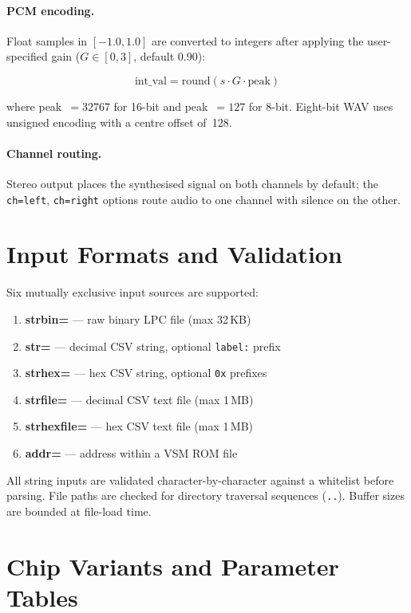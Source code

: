 \documentclass[10pt]{article}
\begin{document}
\paragraph{PCM encoding.}
Float samples in $[-1.0, 1.0]$ are converted to integers after applying the
user-specified gain ($G \in [0, 3]$, default 0.90):

\[
\text{int\_val} = \text{round}(s \cdot G \cdot \text{peak})
\]

where peak~$= 32767$ for 16-bit and peak~$= 127$ for 8-bit. Eight-bit WAV uses
unsigned encoding with a centre offset of~128.

\paragraph{Channel routing.}
Stereo output places the synthesised signal on both channels by default; the
\texttt{ch=left}, \texttt{ch=right} options route audio to one channel with
silence on the other.

\section{Input Formats and Validation}
\label{sec:input}

Six mutually exclusive input sources are supported:

\begin{enumerate}[noitemsep]
\item \textbf{strbin=} — raw binary LPC file (max 32\,KB)
\item \textbf{str=} — decimal CSV string, optional \texttt{label:} prefix
\item \textbf{strhex=} — hex CSV string, optional \texttt{0x} prefixes
\item \textbf{strfile=} — decimal CSV text file (max 1\,MB)
\item \textbf{strhexfile=} — hex CSV text file (max 1\,MB)
\item \textbf{addr=} — address within a VSM ROM file
\end{enumerate}

All string inputs are validated character-by-character against a whitelist
before parsing.  File paths are checked for directory traversal sequences
(\texttt{..}).  Buffer sizes are bounded at file-load time.

\section{Chip Variants and Parameter Tables}
\label{sec:chips}
\end{document}
